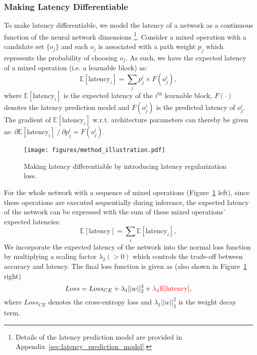 \documentclass{article} \usepackage{iclr2019_conference,times}
\begin{document}
\subsubsection{Making Latency Differentiable}
To make latency differentiable, we model the latency of a network as a continuous function of the neural network dimensions \footnote{Details of the latency prediction model are provided in Appendix~\ref{sec:latency_prediction_model}.}. Consider a mixed operation with a candidate set $\{o_j\}$ and each $o_j$ is associated with a path weight $p_j$ which represents the probability of choosing $o_j$. As such, we have the expected latency of a mixed operation (i.e. a learnable block) as:
\begin{equation}\label{eq:expected_latency_block}
    \mathbb{E} [\text{latency}_i] = \sum_j p_j^i \times F(o_j^i),
\end{equation}
where $\mathbb{E} [\text{latency}_i]$ is the expected latency of the $i^{th}$ learnable block, $F(\cdot)$ denotes the latency prediction model and $F(o_j^i)$ is the predicted latency of $o_j^i$. The gradient of $\mathbb{E} [\text{latency}_i]$ w.r.t. architecture parameters can thereby be given as: $\partial \mathbb{E} [\text{latency}_i]~/~\partial p_j^i = F(o_j^i)$.

\begin{figure}[t]
\centering
    \texttt{[image: figures/method\_illustration.pdf]}
\caption{Making latency differentiable by introducing latency regularization loss.}
    \label{fig:expected_latency}
\end{figure}

For the whole network with a sequence of mixed operations (Figure~\ref{fig:expected_latency} left), since these operations are executed sequentially during inference, the expected latency of the network can be expressed with the sum of these mixed operations' expected latencies:
\begin{equation}\label{eq:expected_latency_net}
    \mathbb{E} [\text{latency}] = \sum_i \mathbb{E} [\text{latency}_i],
\end{equation}
We incorporate the expected latency of the network into the normal loss function by multiplying a scaling factor $\lambda_2 (> 0)$ which controls the trade-off between accuracy and latency. The final loss function is given as (also shown in Figure~\ref{fig:expected_latency} right)
\begin{equation}
    Loss = Loss_{CE} + \lambda_1 ||w||_2^2 +  {\color{red} \lambda_2 \mathbb{E}[\text{latency}]},
\end{equation}
where $Loss_{CE}$ denotes the cross-entropy loss and $\lambda_1 ||w||_2^2$ is the weight decay term. 
\end{document}
